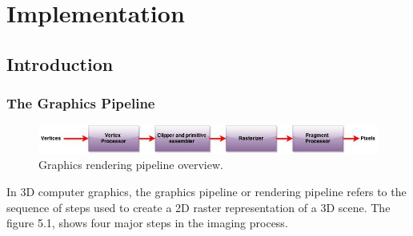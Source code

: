 
\newcommand{\BibTeX}{Bib\TeX}

\chapter{Implementation}\label{chap:refs}

\section{Introduction}

\subsection{The Graphics Pipeline}

\begin{figure}[!h]
\centering
\includegraphics[width=450pt]{Images/graphics_pipeline.jpg}
\caption{\label{fig:ray_cast1.jpg} Graphics rendering pipeline overview.}
\end{figure}

In 3D computer graphics, the graphics pipeline or rendering pipeline refers to the sequence of steps used to create a 2D raster representation of a 3D scene. The figure 5.1, shows four major steps in the imaging process.

